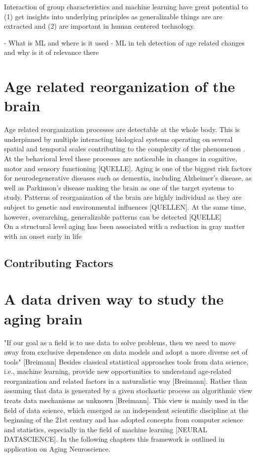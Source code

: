 Interaction of group characteristics and machine learning have great potential to (1) get insights into  underlying principles as generalizable things are are extracted and (2) are important in human centered technology. 

- What is ML and where is it used 
- ML in teh detection of age related changes and why is it of relevance there

	\section{Age related reorganization of the brain}
	Age related reorganization processes are detectable at the whole body. This is underpinned by multiple interacting biological systems operating on several spatial and temporal scales contributing to the complexity of the phenomenon \cite{Mooney2016}. At the behavioral level these processes are noticeable in changes in cognitive, motor and sensory functioning [QUELLE]. Aging is one of the biggest risk factors for neurodegenerative diseases such as dementia, including Alzheimer's disease, as well as Parkinson's disease making the brain as one of the target systems to study. Patterns of reorganization of the brain are highly individual as they are subject to genetic and environmental influences [QUELLEN]. At the same time, however, overarching, generalizable patterns can be detected [QUELLE]\\
	On a structural level aging has been associated with a reduction in gray matter with an onset early in life 

	\subsection{Contributing Factors}

	\section{A data driven way to study the aging brain}
	"If our goal as a field is to use data to solve problems, then we need to move away from exclusive dependence on data models and adopt a more diverse set of tools" [Breimann] 
	Besides classical statistical approaches tools from data science, i.e., machine learning, provide new opportunities to understand age-related reorganization and related factors in a naturalistic way [Breimann]. Rather than assuming that data is generated by a given stochastic process an algorithmic view treats data mechanisms as unknown [Breimann]. This view is mainly used in the field of data science, which emerged as an independent scientific discipline at the beginning of the 21st century and has adopted concepts from computer science and statistics, especially in the field of machine learning [NEURAL DATASCIENCE]. In the following chapters this framework is outlined in application on Aging Neuroscience.   


